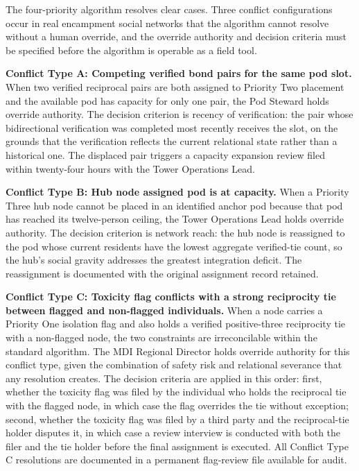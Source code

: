 \documentclass[12pt, letterpaper]{article}
\begin{document}
The four-priority algorithm resolves clear cases. Three conflict configurations occur in real encampment social networks that the algorithm cannot resolve without a human override, and the override authority and decision criteria must be specified before the algorithm is operable as a field tool.

\textbf{Conflict Type A: Competing verified bond pairs for the same pod slot.} When two verified reciprocal pairs are both assigned to Priority Two placement and the available pod has capacity for only one pair, the Pod Steward holds override authority. The decision criterion is recency of verification: the pair whose bidirectional verification was completed most recently receives the slot, on the grounds that the verification reflects the current relational state rather than a historical one. The displaced pair triggers a capacity expansion review filed within twenty-four hours with the Tower Operations Lead.

\textbf{Conflict Type B: Hub node assigned pod is at capacity.} When a Priority Three hub node cannot be placed in an identified anchor pod because that pod has reached its twelve-person ceiling, the Tower Operations Lead holds override authority. The decision criterion is network reach: the hub node is reassigned to the pod whose current residents have the lowest aggregate verified-tie count, so the hub's social gravity addresses the greatest integration deficit. The reassignment is documented with the original assignment record retained.

\textbf{Conflict Type C: Toxicity flag conflicts with a strong reciprocity tie between flagged and non-flagged individuals.} When a node carries a Priority One isolation flag and also holds a verified positive-three reciprocity tie with a non-flagged node, the two constraints are irreconcilable within the standard algorithm. The MDI Regional Director holds override authority for this conflict type, given the combination of safety risk and relational severance that any resolution creates. The decision criteria are applied in this order: first, whether the toxicity flag was filed by the individual who holds the reciprocal tie with the flagged node, in which case the flag overrides the tie without exception; second, whether the toxicity flag was filed by a third party and the reciprocal-tie holder disputes it, in which case a review interview is conducted with both the filer and the tie holder before the final assignment is executed. All Conflict Type C resolutions are documented in a permanent flag-review file available for audit.
\end{document}
